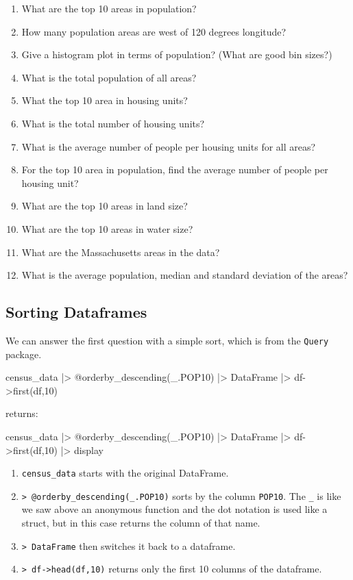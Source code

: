 \begin{enumerate}

\item What are the top 10 areas in population?
\item How many population areas are west of 120 degrees longitude?
\item Give a histogram plot in terms of population? (What are good bin sizes?)
\item What is the total population of all areas?
\item What the top 10 area in housing units?
\item What is the total number of housing units?
\item What is the average number of people per housing units for all areas?
\item For the top 10 area in population, find the average number of people per housing unit?
\item What are the top 10 areas in land size?
\item What are the top 10 areas in water size?
\item What are the Massachusetts areas in the data?
\item What is the average population, median and standard deviation of the areas?
\end{enumerate}

\subsection{Sorting Dataframes}

We can answer the first question with a simple sort, which is from the
\texttt{Query} package.

\begin{jlblock}[census]
census_data |> 
  @orderby_descending(_.POP10) |> 
  DataFrame |> 
  df->first(df,10)
\end{jlblock}
returns:
\begin{jlcode}[census]
census_data |> 
  @orderby_descending(_.POP10) |> 
  DataFrame |> 
  df->first(df,10) |> display
\end{jlcode} 
\printpythontex[verbatim][breakanywhere=true]

\begin{enumerate}
\item  \texttt{census\_data} starts with the original DataFrame.
\item  \texttt{\textbar{}\textgreater{}\ @orderby\_descending(\_.POP10)} sorts by the column \texttt{POP10}. The \texttt{\_} is like we saw above an anonymous function and the dot notation is used like a struct, but in this case returns the column of that name.
\item \texttt{\textbar{}\textgreater{}\ DataFrame} then switches it back to a dataframe.
\item \texttt{\textbar{}\textgreater{}\ df-\textgreater{}head(df,10)} returns only the first 10 columns of the dataframe.
\end{enumerate}

